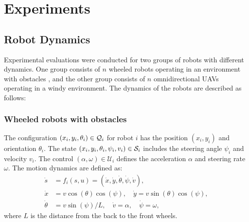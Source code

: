 \documentclass{article}
\begin{document}
\section{Experiments}
\label{sec:experiments}

\subsection{Robot Dynamics}
Experimental evaluations were conducted for two groups of robots with different dynamics. One group consists of $n$ wheeled robots operating in an environment with obstacles \cite{plaku2021}, and the other group consists of $n$ omnidirectional UAVs operating in a windy environment. The dynamics of the robots are described as follows:

\subsubsection{Wheeled robots with obstacles}  The configuration $(x_i,y_i,\theta_i) \in \mathcal{Q}_i$ for robot $i$ has the position $(x_i,y_i)$ and orientation $\theta_i$. The state $(x_i,y_i,\theta_i,\psi_i,v_i) \in \mathcal{S}_i$ includes the steering angle $\psi_i$ and velocity $v_i$. The control $(\alpha, \omega) \in \mathcal{U}_i$ defines the acceleration $\alpha$ and steering rate $\omega$. The motion dynamics are defined as:
\begin{align}
\dot{s} &= f_i(s,u) = (\dot{x}, \dot{y}, \dot{\theta}, \dot{\psi}, \dot{v}), \\
\dot{x} &= v \cos(\theta) \cos(\psi), \quad \dot{y} = v \sin(\theta) \cos(\psi), \\
\dot{\theta} &= v \sin(\psi) / L, \quad  \dot{v} = \alpha, \quad \dot{\psi} = \omega,
\end{align}
where $L$ is the distance from the back to the front wheels.
\end{document}
